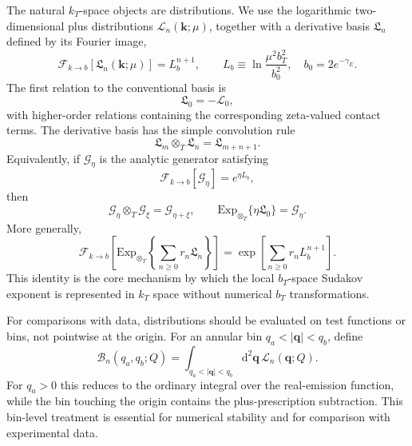 \documentclass[aps,prd,preprint,superscriptaddress,nofootinbib,longbibliography]{revtex4-2}
\newcommand{\dd}{\mathrm d}
\newcommand{\bk}{\bm k}
\newcommand{\bq}{\bm q}
\newcommand{\ot}{\otimes_T}
\newcommand{\ExpT}{\mathrm{Exp}_{\otimes_T}}
\begin{document}
The natural $k_T$-space objects are distributions.  We use the logarithmic two-dimensional plus distributions $\mathcal L_n(\bk;\mu)$, together with a derivative basis $\mathfrak L_n$ defined by its Fourier image,
\begin{equation}
  \mathcal F_{k\to b}\!\left[\mathfrak L_n(\bk;\mu)\right]
  =L_b^{n+1},
  \qquad
  L_b\equiv \ln\frac{\mu^2 b_T^2}{b_0^2},\quad b_0=2e^{-\gamma_E}.
  \label{eq:frak-def}
\end{equation}
The first relation to the conventional basis is
\begin{equation}
  \mathfrak L_0=-\mathcal L_0,
\end{equation}
with higher-order relations containing the corresponding zeta-valued contact terms.  The derivative basis has the simple convolution rule
\begin{equation}
  \boxed{\mathfrak L_m\ot \mathfrak L_n=\mathfrak L_{m+n+1}.}
  \label{eq:frak-algebra}
\end{equation}
Equivalently, if $\mathcal G_\eta$ is the analytic generator satisfying
\begin{equation}
  \mathcal F_{k\to b}\!\left[\mathcal G_\eta\right]=e^{\eta L_b},
\end{equation}
then
\begin{equation}
  \mathcal G_\eta\ot \mathcal G_\xi=\mathcal G_{\eta+\xi},
  \qquad
  \ExpT\{\eta\mathfrak L_0\}=\mathcal G_\eta .
\end{equation}
More generally,
\begin{equation}
  \mathcal F_{k\to b}\!\left[
  \ExpT\left\{\sum_{n\ge0}r_n\mathfrak L_n\right\}\right]
  =\exp\left[\sum_{n\ge0}r_n L_b^{n+1}\right].
  \label{eq:convolution-exponential-theorem}
\end{equation}
This identity is the core mechanism by which the local $b_T$-space Sudakov exponent is represented in $k_T$ space without numerical $b_T$ transformations.

For comparisons with data, distributions should be evaluated on test functions or bins, not pointwise at the origin.  For an annular bin $q_a<|\bq|<q_b$, define
\begin{equation}
  \mathcal B_n(q_a,q_b;Q)
  =\int_{q_a<|\bq|<q_b}\dd^2\bq\,\mathcal L_n(\bq;Q).
\end{equation}
For $q_a>0$ this reduces to the ordinary integral over the real-emission function, while the bin touching the origin contains the plus-prescription subtraction.  This bin-level treatment is essential for numerical stability and for comparison with experimental data.
\end{document}
